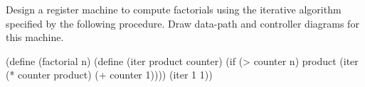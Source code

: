 \begin{exercise}
	\label{Exercise 5.1}
	Design a register machine to compute factorials using the iterative algorithm specified by the following procedure.
	Draw data-path and controller diagrams for this machine.
	\begin{scheme}
	  (define (factorial n)
	    (define (iter product counter)
	      (if (> counter n)
	          product
	          (iter (* counter product)
	                (+ counter 1))))
	    (iter 1 1))
	\end{scheme}
\end{exercise}








